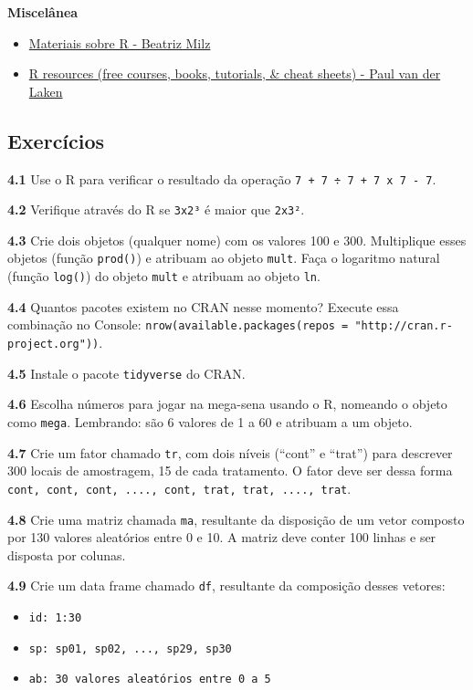 \documentclass[
]{article}
\providecommand{\tightlist}{%
  \setlength{\itemsep}{0pt}\setlength{\parskip}{0pt}}
\begin{document}
\textbf{Miscelânea}

\begin{itemize}
\tightlist
\item
  \href{https://materiais-estudo-r.netlify.app/}{Materiais sobre R - Beatriz Milz}
\item
  \href{https://paulvanderlaken.com/2017/08/10/r-resources-cheatsheets-tutorials-books}{R resources (free courses, books, tutorials, \& cheat sheets) - Paul van der Laken}
\end{itemize}

\hypertarget{exercuxedcios}{%
\subsection{Exercícios}\label{exercuxedcios}}

\textbf{4.1}
Use o R para verificar o resultado da operação \texttt{7\ +\ 7\ ÷\ 7\ +\ 7\ x\ 7\ -\ 7}.

\textbf{4.2}
Verifique através do R se \texttt{3x2³} é maior que \texttt{2x3²}.

\textbf{4.3}
Crie dois objetos (qualquer nome) com os valores 100 e 300. Multiplique esses objetos (função \texttt{prod()}) e atribuam ao objeto \texttt{mult}. Faça o logaritmo natural (função \texttt{log()}) do objeto \texttt{mult} e atribuam ao objeto \texttt{ln}.

\textbf{4.4}
Quantos pacotes existem no CRAN nesse momento? Execute essa combinação no Console: \texttt{nrow(available.packages(repos\ =\ "http://cran.r-project.org"))}.

\textbf{4.5}
Instale o pacote \texttt{tidyverse} do CRAN.

\textbf{4.6}
Escolha números para jogar na mega-sena usando o R, nomeando o objeto como \texttt{mega}. Lembrando: são 6 valores de 1 a 60 e atribuam a um objeto.

\textbf{4.7}
Crie um fator chamado \texttt{tr}, com dois níveis (``cont'' e ``trat'') para descrever 300 locais de amostragem, 15 de cada tratamento. O fator deve ser dessa forma \texttt{cont,\ cont,\ cont,\ ....,\ cont,\ trat,\ trat,\ ....,\ trat}.

\textbf{4.8}
Crie uma matriz chamada \texttt{ma}, resultante da disposição de um vetor composto por 130 valores aleatórios entre 0 e 10. A matriz deve conter 100 linhas e ser disposta por colunas.

\textbf{4.9}
Crie um data frame chamado \texttt{df}, resultante da composição desses vetores:

\begin{itemize}
\tightlist
\item
  \texttt{id:\ 1:30}
\item
  \texttt{sp:\ sp01,\ sp02,\ ...,\ sp29,\ sp30}
\item
  \texttt{ab:\ 30\ valores\ aleatórios\ entre\ 0\ a\ 5}
\end{itemize}
\end{document}
